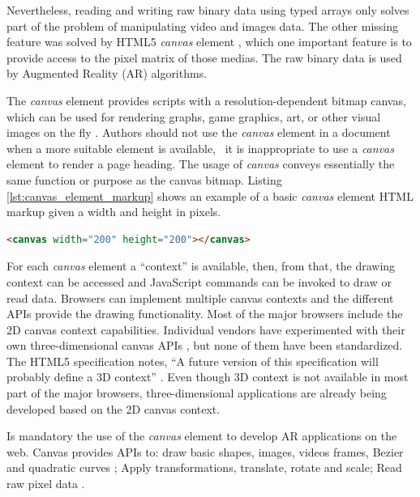 Nevertheless, reading and writing raw binary data using typed arrays only solves part of the problem of manipulating video and images data. The other missing feature was solved by HTML5 \cite{Hickson2013} \textit{canvas} element \cite{Canvas2013}, which one important feature is to provide access to the pixel matrix of those medias. The raw binary data is used by Augmented Reality (AR) algorithms.

The \textit{canvas} element \cite{Canvas2013} provides scripts with a resolution-dependent bitmap canvas, which can be used for rendering graphs, game graphics, art, or other visual images on the fly \cite{Canvas2013}. Authors should not use the \textit{canvas} element \cite{Canvas2013} in a document when a more suitable element is available, \eg\ it is inappropriate to use a \textit{canvas} element \cite{Canvas2013} to render a page heading. The usage of \textit{canvas} conveys essentially the same function or purpose as the canvas bitmap. Listing \ref{lst:canvas_element_markup} shows an example of a basic \textit{canvas} element \cite{Canvas2013} HTML markup given a width and height in pixels.

\begin{lstlisting}[language=HTML,label={lst:canvas_element_markup},caption=The HTML canvas element markup]
<canvas width="200" height="200"></canvas>
\end{lstlisting}

For each \textit{canvas} element \cite{Canvas2013} a ``context'' is available, then, from that, the drawing context can be accessed and JavaScript commands can be invoked to draw or read data. Browsers can implement multiple canvas contexts and the different APIs provide the drawing functionality. Most of the major browsers include the 2D canvas context capabilities. Individual vendors have experimented with their own three-dimensional canvas APIs \cite{Canvas2013}, but none of them have been standardized. The HTML5 \cite{Hickson2013} specification notes, ``A future version of this specification will probably define a 3D context'' \cite{Canvas2013}. Even though 3D context is not available in most part of the major browsers, three-dimensional applications are already being developed based on the 2D canvas context.

Is mandatory the use of the \textit{canvas} element \cite{Canvas2013} to develop AR applications on the web. Canvas provides APIs to: draw basic shapes, images, videos frames, Bezier and quadratic curves \cite{Hartley2004}; Apply transformations, translate, rotate and scale; Read raw pixel data \etc.

